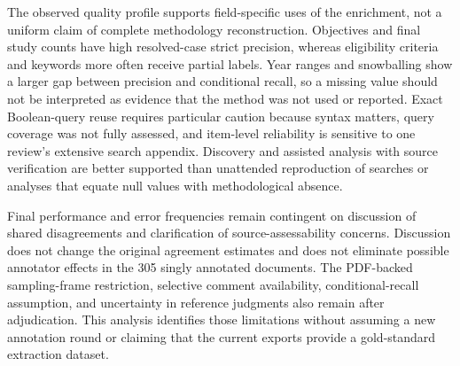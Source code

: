 The observed quality profile supports field-specific uses of the enrichment, not a uniform claim of complete methodology reconstruction. Objectives and final study counts have high resolved-case strict precision, whereas eligibility criteria and keywords more often receive partial labels. Year ranges and snowballing show a larger gap between precision and conditional recall, so a missing value should not be interpreted as evidence that the method was not used or reported. Exact Boolean-query reuse requires particular caution because syntax matters, query coverage was not fully assessed, and item-level reliability is sensitive to one review's extensive search appendix. Discovery and assisted analysis with source verification are better supported than unattended reproduction of searches or analyses that equate null values with methodological absence.

Final performance and error frequencies remain contingent on discussion of shared disagreements and clarification of source-assessability concerns. Discussion does not change the original agreement estimates and does not eliminate possible annotator effects in the 305 singly annotated documents. The PDF-backed sampling-frame restriction, selective comment availability, conditional-recall assumption, and uncertainty in reference judgments also remain after adjudication. This analysis identifies those limitations without assuming a new annotation round or claiming that the current exports provide a gold-standard extraction dataset.
